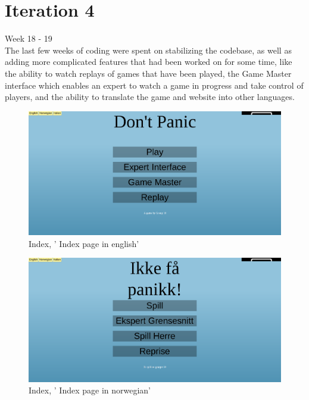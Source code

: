 

\section{Iteration 4}

Week 18 - 19\\
\newline
The last few weeks of coding were spent on stabilizing the codebase, as well as adding more complicated features that had been worked on for some time, like the ability to watch replays of games that have been played, the Game Master interface which enables an expert to watch a game in progress and take control of players, and the ability to translate the game and website into other languages.\\



\begin{figure}[H]
  \centering
    \includegraphics[width=1.0\textwidth]{img/indexen.png}
  \caption{Index, ' Index page in english'} 
  \label{fig:indexen}
\end{figure}

\begin{figure}[H]
  \centering
    \includegraphics[width=1.0\textwidth]{img/indexno.png}
  \caption{Index, ' Index page in norwegian'} 
  \label{fig:indexno}
\end{figure}


